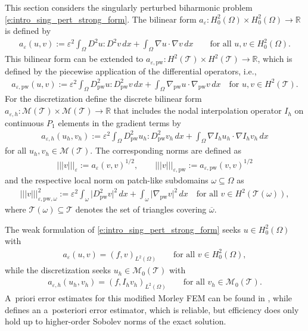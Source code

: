 \documentclass[a4paper]{amsart}
\theoremstyle{definition}
\numberwithin{equation}{section}
\numberwithin{theorem}{section}
\newcommand{\R}{\mathbb{R}}
\newcommand{\pw}{\mathrm{pw}}
\newcommand{\tri}{\mathcal{T}}
\newcommand{\ennorm}[1]{\lvert\!\lvert\!\lvert #1 \rvert\!\rvert\!\rvert}
\begin{document}
This section considers the singularly perturbed biharmonic problem
\eqref{e:intro_sing_pert_strong_form}.
The bilinear form $a_\varepsilon:H^2_0(\Omega)\times H^2_0(\Omega)\to\R$
is defined by 
\begin{align*}
    a_\varepsilon(u,v):=\varepsilon^2 \int_\Omega D^2u:D^2 v\,dx
       + \int_\Omega \nabla u\cdot\nabla v\,dx
    \qquad \text{for all }u,v\in H^2_0(\Omega).
\end{align*}
This bilinear form can be extended to
$a_{\varepsilon,\pw}:H^2(\tri)\times H^2(\tri)\to\R$,
which is defined by the piecewise
application of the differential operators, i.e.,
\begin{align*}
    a_{\varepsilon,\pw}(u,v):=\varepsilon^2 \int_\Omega D_\pw^2u:D_\pw^2v\,dx
       + \int_\Omega \nabla_\pw u\cdot\nabla_\pw v\,dx
    \quad \text{for }u,v\in H^2(\tri).
\end{align*}
For the discretization define the discrete 
bilinear form
$a_{\varepsilon,h}:\mathcal{M}(\tri)\times \mathcal{M}(\tri)\to\R$
that includes the nodal interpolation operator $I_h$ on continuous
$P_1$ elements in the gradient terms
\cite{WangXuHu2006}
by 
\begin{align*}
    a_{\varepsilon,h}(u_h,v_h)
    :=\varepsilon^2 \int_\Omega D_\pw^2u_h:D_\pw^2v_h\,dx
       + \int_\Omega \nabla I_h u_h\cdot\nabla I_h v_h\,dx
\end{align*}
for all $u_h,v_h\in \mathcal{M}(\tri)$.
The corresponding norms are defined as 
\begin{align*}
    \ennorm{v}_\varepsilon:=a_\varepsilon(v,v)^{1/2},
    \qquad 
    \ennorm{v}_{\varepsilon,\pw}:= a_{\varepsilon,\pw}(v,v)^{1/2}
\end{align*}
and the respective local norm on patch-like subdomains
$\omega\subseteq\Omega$ as 
\begin{align*}
    \ennorm{v}_{\varepsilon,\pw,\omega}^2
    :=\varepsilon^2 \int_\omega \lvert D_\pw^2v\rvert^2\,dx
            + \int_\omega \vert \nabla_\pw v\rvert^2\,dx
        \quad \text{for all }v\in H^2(\tri(\omega)),      
\end{align*}
where $\tri(\omega)\subseteq\tri$ denotes the set of triangles covering
$\overline\omega.$

The weak formulation of \eqref{e:intro_sing_pert_strong_form} 
seeks $u\in H^2_0(\Omega)$ with 
\begin{align}\label{e:sing_pert_weak_form}
    a_\varepsilon(u,v)=(f,v)_{L^2(\Omega)} 
    \qquad \text{for all }v\in H^2_0(\Omega),
\end{align}
while the discretization seeks $u_h\in \mathcal{M}_0(\tri)$
with 
\begin{align}\label{e:sing_pert_discrete_problem}
    a_{\varepsilon,h}(u_h,v_h) = (f,I_h v_h)_{L^2(\Omega)}
    \qquad \text{for all }v_h\in \mathcal{M}_0(\tri).
\end{align}
A~priori error estimates for this modified Morley FEM 
can be found in \cite{WangXuHu2006}, while
\cite{ZhangWang2008} defines an a~posteriori error estimator,
which is reliable, but efficiency does only hold up to
higher-order Sobolev norms of the exact solution.
\end{document}
